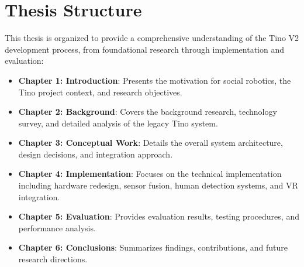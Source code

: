 \section{Thesis Structure}
This thesis is organized to provide a comprehensive understanding of the Tino V2 development process, from foundational research through implementation and evaluation:

\begin{itemize}
    \item \textbf{Chapter 1: Introduction}: Presents the motivation for social robotics, the Tino project context, and research objectives.
    \item \textbf{Chapter 2: Background}: Covers the background research, technology survey, and detailed analysis of the legacy Tino system.
    \item \textbf{Chapter 3: Conceptual Work}: Details the overall system architecture, design decisions, and integration approach.
    \item \textbf{Chapter 4: Implementation}: Focuses on the technical implementation including hardware redesign, sensor fusion, human detection systems, and VR integration.
    \item \textbf{Chapter 5: Evaluation}: Provides evaluation results, testing procedures, and performance analysis.
    \item \textbf{Chapter 6: Conclusions}: Summarizes findings, contributions, and future research directions.
\end{itemize}